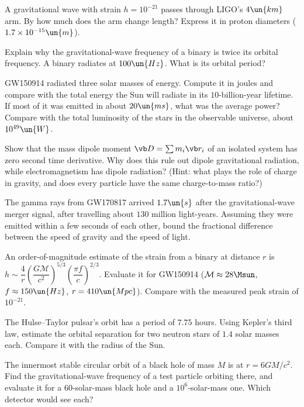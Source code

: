 \begin{problems}
\core A gravitational wave with strain $h = 10^{-21}$ passes through LIGO's $4\un{km}$ arm. By how much does the arm change length? Express it in proton diameters ($1.7\times10^{-15}\un{m}$).

 Explain why the gravitational-wave frequency of a binary is twice its orbital frequency. A binary radiates at $100\un{Hz}$. What is its orbital period?

\core \label{prob:energy150914} GW150914 radiated three solar masses of energy. Compute it in joules and compare with the total energy the Sun will radiate in its $10$-billion-year lifetime. If most of it was emitted in about $20\un{ms}$, what was the average power? Compare with the total luminosity of the stars in the observable universe, about $10^{49}\un{W}$.

\core \label{prob:nodipole} Show that the mass dipole moment $\vb D = \sum m_i\vb r_i$ of an isolated system has zero second time derivative. Why does this rule out dipole gravitational radiation, while electromagnetism has dipole radiation? (Hint: what plays the role of charge in gravity, and does every particle have the same charge-to-mass ratio?)

\core \label{prob:speed-of-gravity} The gamma rays from GW170817 arrived $1.7\un{s}$ after the gravitational-wave merger signal, after travelling about $130$ million light-years. Assuming they were emitted within a few seconds of each other, bound the fractional difference between the speed of gravity and the speed of light.

 An order-of-magnitude estimate of the strain from a binary at distance $r$ is $h\sim\dfrac{4}{r}\left(\dfrac{G\mathcal M}{c^2}\right)^{5/3}\left(\dfrac{\pi f}{c}\right)^{2/3}$. Evaluate it for GW150914 ($\mathcal M\approx28\Msun$, $f\approx150\un{Hz}$, $r = 410\un{Mpc}$). Compare with the measured peak strain of $10^{-21}$.

 The Hulse--Taylor pulsar's orbit has a period of $7.75$ hours. Using Kepler's third law, estimate the orbital separation for two neutron stars of $1.4$ solar masses each. Compare it with the radius of the Sun.

 The innermost stable circular orbit of a black hole of mass $M$ is at $r = 6GM/c^2$. Find the gravitational-wave frequency of a test particle orbiting there, and evaluate it for a $60$-solar-mass black hole and a $10^6$-solar-mass one. Which detector would see each?


\end{problems}
